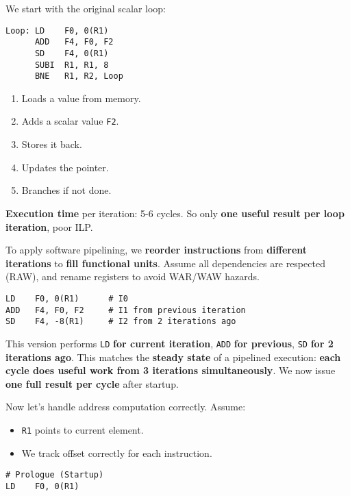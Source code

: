 \begin{examplebox}
    We start with the original scalar loop:
    \begin{lstlisting}[language=riscv]
Loop: LD    F0, 0(R1)
      ADD   F4, F0, F2
      SD    F4, 0(R1)
      SUBI  R1, R1, 8
      BNE   R1, R2, Loop\end{lstlisting}
    \begin{enumerate}
        \item Loads a value from memory.
        \item Adds a scalar value \texttt{F2}.
        \item Stores it back.
        \item Updates the pointer.
        \item Branches if not done.
    \end{enumerate}
    \textbf{Execution time} per iteration: 5-6 cycles. So only \textbf{one useful result per loop iteration}, poor ILP.

    \highspace
    To apply software pipelining, we \textbf{reorder instructions} from \textbf{different iterations} to \textbf{fill functional units}. Assume all dependencies are respected (RAW), and rename registers to avoid WAR/WAW hazards.
    \begin{lstlisting}[language=riscv]
LD    F0, 0(R1)      # I0
ADD   F4, F0, F2     # I1 from previous iteration
SD    F4, -8(R1)     # I2 from 2 iterations ago\end{lstlisting}
    This version performs \texttt{LD} \textbf{for current iteration}, \texttt{ADD} \textbf{for previous}, \texttt{SD} \textbf{for 2 iterations ago}. This matches the \textbf{steady state} of a pipelined execution: \textbf{each cycle does useful work from 3 iterations simultaneously}. We now issue \textbf{one full result per cycle} after startup.

    \highspace
    Now let's handle address computation correctly. Assume:
    \begin{itemize}
        \item \texttt{R1} points to current element.
        \item We track offset correctly for each instruction.
    \end{itemize}
    \begin{lstlisting}[language=riscv]
# Prologue (Startup)
LD    F0, 0(R1)


\end{lstlisting}
\end{examplebox}
